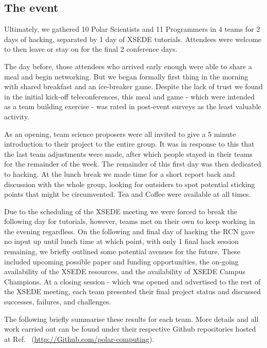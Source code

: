 \documentclass[conference]{IEEEtran}
\begin{document}
\subsection{The event}
Ultimately, we gathered 10 Polar Scientists and 11 Programmers in 4 teams for 2 days of hacking, separated by 1 day of XSEDE tutorials.  Attendees were welcome to then leave or stay on for the final 2 conference days.  

The day before, those attendees who arrived early enough were able to share a meal and begin networking.  But we began formally first thing in the morning with shared breakfast and an ice-breaker game.  Despite the lack of trust we found in the initial kick-off teleconferences, this meal and game - which  were intended as a team building exercise - was rated in post-event surveys as the least valuable activity.

As an opening, team science proposers were all invited to give a 5 minute introduction to their project to the entire group.  It was in response to this that the last team adjustments were made, after which people stayed in their teams for the remainder of the week.  The remainder of this first day was then dedicated to hacking.  At the lunch break we made time for a short report back and discussion with the whole group, looking for outsiders to spot potential sticking points that might be circumvented.  Tea and Coffee were available at all times.

Due to the scheduling of the XSEDE meeting we were forced to break the following day for tutorials, however, teams met on their own to keep working in the evening regardless.  On the following and final day of hacking the RCN gave no input up until lunch time at which point, with only 1 final hack session remaining, we briefly outlined some potential avenues for the future.  These included upcoming possible paper and funding opportunities, the on-going availability of the XSEDE resources, and the availability of XSEDE Campus Champions.  At a closing session - which was opened and advertised to the rest of the XSEDE meeting, each team presented their final project status and discussed successes, failures, and challenges.


The following briefly summarise these results for each team.  More details and all work carried out can be found under their respective Github repositories hosted at Ref.~\cite{polar-computing-Github} (\url{http://Github.com/polar-computing}). 
\end{document}
